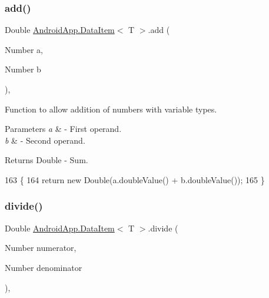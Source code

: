 \subsubsection{\texorpdfstring{add()}{add()}}
{\footnotesize\ttfamily Double \hyperlink{class_android_app_1_1_data_item}{Android\+App.\+Data\+Item}$<$ T $>$.add (\begin{DoxyParamCaption}\item[{Number}]{a,  }\item[{Number}]{b }\end{DoxyParamCaption})\hspace{0.3cm}{\ttfamily [inline]}, {\ttfamily [private]}}



Function to allow addition of numbers with variable types. 


\begin{DoxyParams}{Parameters}
{\em a} & -\/ First operand. \\
\hline
{\em b} & -\/ Second operand. \\
\hline
\end{DoxyParams}
\begin{DoxyReturn}{Returns}
Double -\/ Sum. 
\end{DoxyReturn}

\begin{DoxyCode}
163                                            \{
164         \textcolor{keywordflow}{return} \textcolor{keyword}{new} Double(a.doubleValue() + b.doubleValue());
165     \}
\end{DoxyCode}
\mbox{\label{class_android_app_1_1_data_item_a3c4b68091e69bed9af18df05d6ea26a5}} 
\subsubsection{\texorpdfstring{divide()}{divide()}}
{\footnotesize\ttfamily Double \hyperlink{class_android_app_1_1_data_item}{Android\+App.\+Data\+Item}$<$ T $>$.divide (\begin{DoxyParamCaption}\item[{Number}]{numerator,  }\item[{Number}]{denominator }\end{DoxyParamCaption})\hspace{0.3cm}{\ttfamily [inline]}, {\ttfamily [private]}}



